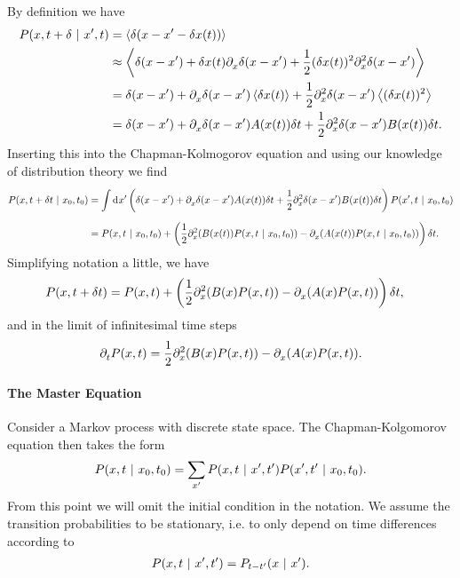 By definition we have
\begin{align*}
	P(x, t + \delta \ | \  x^{\prime}, t) &= \expval{\delta(x - x\ensuremath{^{\prime}}- \delta x(t))} \\
	                              &\approx \expval{\delta(x - x\ensuremath{^{\prime}}) + \delta x(t)\partial^{}_{x}\delta(x - x\ensuremath{^{\prime}}) + \frac{1}{2}(\delta x(t))^{2}\partial^{2}_{x}\delta(x - x\ensuremath{^{\prime}})} \\
	                              &= \delta(x - x^{\prime}) + \partial^{}_{x}\delta(x - x^{\prime})\expval{\delta x(t)} + \frac{1}{2}\partial^{2}_{x}\delta(x - x^{\prime})\expval{(\delta x(t))^{2}} \\
	                              &= \delta(x - x^{\prime}) + \partial^{}_{x}\delta(x - x^{\prime})A(x(t))\delta t + \frac{1}{2}\partial^{2}_{x}\delta(x - x^{\prime})B(x(t))\delta t.
\end{align*}
Inserting this into the Chapman-Kolmogorov equation and using our knowledge of distribution theory we find
\begin{align*}
	P(x, t + \delta t \ | \  x_{0}, t_{0}) &= \int\limits_{}^{}\dd[]{x\ensuremath{^{\prime}}}\left(\delta(x - x^{\prime}) + \partial^{}_{x}\delta(x - x^{\prime})A(x(t))\delta t + \frac{1}{2}\partial^{2}_{x}\delta(x - x^{\prime})B(x(t))\delta t\right)P(x^{\prime}, t \ | \  x_{0}, t_{0}) \\
	                                      &= P(x, t \ | \  x_{0}, t_{0}) + \left(\frac{1}{2}\partial^{2}_{x}(B(x(t))P(x, t \ | \  x_{0}, t_{0})) - \partial^{}_{x}(A(x(t))P(x, t \ | \  x_{0}, t_{0}))\right)\delta t.
\end{align*}
Simplifying notation a little, we have
\begin{align*}
	P(x, t + \delta t) &= P(x, t) + \left(\frac{1}{2}\partial^{2}_{x}(B(x)P(x, t)) - \partial^{}_{x}(A(x)P(x, t))\right)\delta t,
\end{align*}
and in the limit of infinitesimal time steps
\begin{align*}
	\partial^{}_{t}P(x, t) = \frac{1}{2}\partial^{2}_{x}(B(x)P(x, t)) - \partial^{}_{x}(A(x)P(x, t)).
\end{align*}

\paragraph{The Master Equation}
Consider a Markov process with discrete state space. The Chapman-Kolgomorov equation then takes the form
\begin{align*}
	P(x, t \ | \  x_{0}, t_{0}) = \sum\limits_{x^{\prime}}P(x, t \ | \  x^{\prime}, t^{\prime})P(x^{\prime}, t^{\prime} \ | \  x_{0}, t_{0}).
\end{align*}
From this point we will omit the initial condition in the notation. We assume the transition probabilities to be stationary, i.e. to only depend on time differences according to
\begin{align*}
	P(x, t \ | \  x^{\prime}, t^{\prime}) = P_{t - t^{\prime}}(x \ | \  x^{\prime}).
\end{align*}

